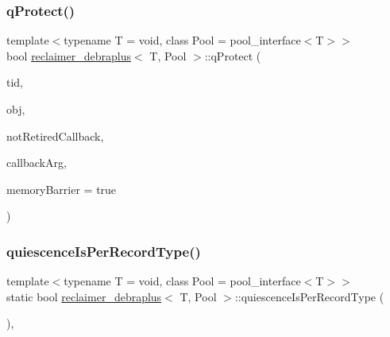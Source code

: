 \subsubsection{\texorpdfstring{q\+Protect()}{qProtect()}}
{\footnotesize\ttfamily template$<$typename T  = void, class Pool  = pool\+\_\+interface$<$\+T$>$$>$ \\
bool \hyperlink{classreclaimer__debraplus}{reclaimer\+\_\+debraplus}$<$ T, Pool $>$\+::q\+Protect (\begin{DoxyParamCaption}\item[{const int}]{tid,  }\item[{T $\ast$const}]{obj,  }\item[{\hyperlink{globals_8h_a57f5c0d40b156d7d996492fb2f16e3cd}{Callback\+Type}}]{not\+Retired\+Callback,  }\item[{\hyperlink{globals_8h_a3de64ef48066ac6430631c8b81a15345}{Callback\+Arg}}]{callback\+Arg,  }\item[{bool}]{memory\+Barrier = {\ttfamily true} }\end{DoxyParamCaption})\hspace{0.3cm}{\ttfamily [inline]}}

\mbox{\label{classreclaimer__debraplus_a5fcce88c53a16023e412f0d1b9d3ae09}} 
\subsubsection{\texorpdfstring{quiescence\+Is\+Per\+Record\+Type()}{quiescenceIsPerRecordType()}}
{\footnotesize\ttfamily template$<$typename T  = void, class Pool  = pool\+\_\+interface$<$\+T$>$$>$ \\
static bool \hyperlink{classreclaimer__debraplus}{reclaimer\+\_\+debraplus}$<$ T, Pool $>$\+::quiescence\+Is\+Per\+Record\+Type (\begin{DoxyParamCaption}{ }\end{DoxyParamCaption})\hspace{0.3cm}{\ttfamily [inline]}, {\ttfamily [static]}}

\mbox{\label{classreclaimer__debraplus_ace3e4760c51f3035446e3fe0f363e6d5}} 

